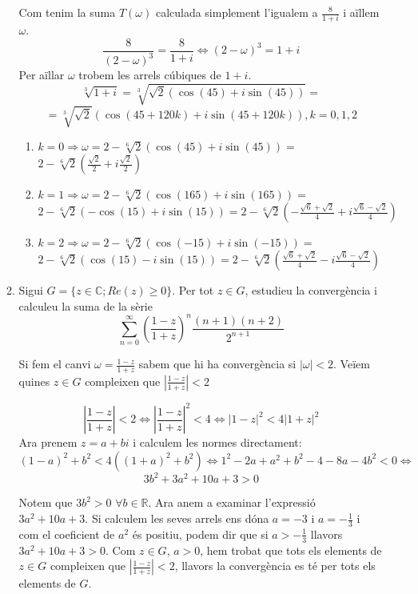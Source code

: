 \documentclass[10pt,a4paper]{article}
\begin{document}
\begin{enumerate}
\begin{enumerate}
	\begin{framed}
	Com tenim la suma $T(\omega)$ calculada simplement l'igualem a $\frac{8}{1+i}$ i aïllem $\omega$.	
	$$ \frac{8}{(2-\omega)^{3}}= \frac{8}{1+i} \Leftrightarrow (2-\omega)^{3} = 1+i$$
	Per aïllar $\omega$ trobem les arrels cúbiques de $1+i$.
	$$\sqrt[3]{1+i} = \sqrt[3]{\sqrt{2}(\cos(45) + i\sin(45))} = 	$$
	$$= \sqrt[3]{\sqrt{2}} (\cos(45+120k)+i\sin(45+120k)), k=0,1,2$$
	
	\begin{enumerate}
	\item $k=0 \Rightarrow \omega = 2-\sqrt[6]{2}(\cos(45)+i\sin(45)) =$\\
			$2-\sqrt[6]{2}\left(\frac{\sqrt{2}}{2}+i\frac{\sqrt{2}}{2}\right)$
	\item $k=1 \Rightarrow \omega = 2-\sqrt[6]{2}(\cos(165)+i\sin(165)) =$\\
			$2-\sqrt[6]{2}(-\cos(15)+i\sin(15)) = 2-\sqrt[6]{2}(-\frac{\sqrt{6}+\sqrt{2}}{4}+i\frac{\sqrt{6}-\sqrt{2}}{4})$
	\item $k=2 \Rightarrow \omega = 2-\sqrt[6]{2}(\cos(-15)+i\sin(-15)) =$\\
			$2-\sqrt[6]{2}(\cos(15)-i\sin(15)) = 2-\sqrt[6]{2}(\frac{\sqrt{6}+\sqrt{2}}{4}-i\frac{\sqrt{6}-\sqrt{2}}{4})$
	\end{enumerate}		
	
	\end{framed}	
	
	\item Sigui $G=\{z\in\mathbb{C}; Re(z)\geq 0\}$. Per tot $z\in G$, estudieu la convergència i calculeu la suma de la sèrie
	$$\sum_{n=0}^{\infty}\left(\frac{1-z}{1+z}\right)^{n}\frac{(n+1)(n+2)}{2^{n+1}}$$

	\begin{framed}
	
	Si fem el canvi $\omega = \frac{1-z}{1+z}$ sabem que hi ha convergència si $|\omega| < 2$. Veïem quines $z\in G$ compleixen que $\left|\frac{1-z}{1+z}\right| < 2$
	
	$$ \left|\frac{1-z}{1+z}\right| < 2 \Leftrightarrow \left|\frac{1-z}{1+z}\right|^{2} < 4 \Leftrightarrow |1-z|^{2} < 4|1+z|^{2}$$	
	Ara prenem $z=a+bi$ i calculem les normes directament:
	$$ (1-a)^{2}+b^{2} < 4((1+a)^{2}+b^{2}) \Leftrightarrow 
		1^{2}-2a+a^{2}+b^{2}-4-8a-4b^{2} < 0 \Leftrightarrow$$
	$$ 3b^{2} + 3a^{2} + 10a + 3 > 0$$
	
	Notem que $3b^{2}>0$ $\forall b\in\mathbb{R}$. Ara anem a examinar l'expressió
	$3a^{2}+10a+3$. Si calculem les seves arrels ens dóna $a=-3$ i $a=-\frac{1}{3}$ i com el coeficient de $a^{2}$ és positiu, podem dir que si $a>-\frac{1}{3}$ llavors $3a^{2}+10a+3>0$. Com $z\in G$, $a>0$, hem trobat que tots els elements de $z\in G$ compleixen que $\left|\frac{1-z}{1+z}\right| < 2$, llavors la convergència es té per tots els elements de $G$.
	

\end{framed}
\end{enumerate}
\end{enumerate}
\end{document}
